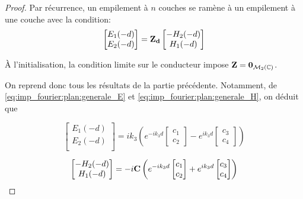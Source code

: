 \begin{proof}
    Par récurrence, un empilement à $n$ couches se ramène à un empilement à une couche avec la condition:
    \begin{equation}
        \begin{bmatrix}
            E_1(-d)\\
            E_2(-d)\\
        \end{bmatrix}
        =
        \mathbf{Z_{d}} 
        \begin{bmatrix}
            -H_2(-d)\\
            H_1(-d)\\
        \end{bmatrix}
    \end{equation}

    À l'initialisation, la condition limite sur le conducteur impose $\mathbf{Z} = \mathbf{0}_{\mathcal{M}_2(\mathbb C)}$.

    On reprend donc tous les résultats de la partie précédente. Notamment, de \eqref{eq:imp_fourier:plan:generale_E} et \eqref{eq:imp_fourier:plan:generale_H}, on déduit que

    \begin{equation}
        \begin{bmatrix}
            E_1(-d)\\
            E_2(-d)\\
        \end{bmatrix}
        = ik_3\left( e^{-ik_3 d}
        \begin{bmatrix}
            c_1 \\
            c_2
        \end{bmatrix}
        -e^{ik_3 d}
        \begin{bmatrix}
            c_3 \\
            c_4
        \end{bmatrix}
        \right)
    \end{equation}

    \begin{equation}
        \begin{bmatrix}
            -H_2(-d)\\
            H_1(-d)\\
        \end{bmatrix}
        =-i
        \mathbf{C}
        \left(
            e^{-ik_3 d}
            \begin{bmatrix}
                c_1 \\
                c_2
            \end{bmatrix}
            +e^{ik_3 d}
            \begin{bmatrix}
                c_3 \\
                c_4
            \end{bmatrix}
        \right)
    \end{equation}


\end{proof}
